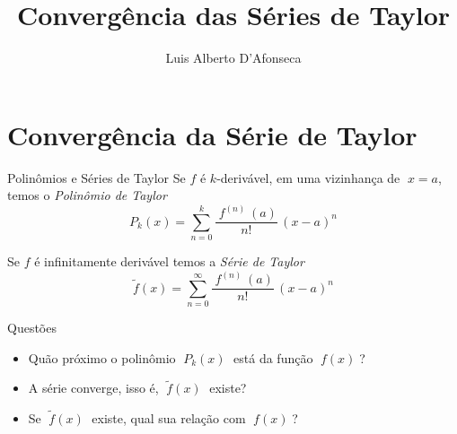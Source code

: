 
\usepackage{apresentacao}
\usepackage{tabto}

\graphicspath{{./figs/}}

\newcommand{\mytitle}   {Convergência das Séries de Taylor}
\title   {\mytitle}
\author  {\large Luis Alberto D'Afonseca}
\date    {}



\begin{frame}
    \titlepage
\end{frame}

\section{Convergência da Série de Taylor}

\begin{frame}{Polinômios e Séries de Taylor}
  Se $f$ é $k$-derivável, em uma vizinhança de $\;x=a$, temos o \emph{Polinômio de Taylor}
  \[
    P_k(x) = \sum_{n=0}^k \frac{\;f^{(n)\;}(a)}{n!}\,(x-a)^n
  \]

  \pause
  \vspace{\baselineskip}
  Se $f$ é infinitamente derivável temos a \emph{Série de Taylor}
  \[
    \tilde{f}(x) = \sum_{n=0}^\infty \frac{\;f^{(n)\;}(a)}{n!}\,(x-a)^n
  \]
\end{frame}

\begin{frame}{Questões}
  \begin{itemize}[<+->]
    \item Quão próximo o polinômio $\;P_k(x)\;$ está da função $\;f(x)\;$?
    \vspace{\baselineskip}
    \item A série converge, isso é, $\;\tilde{f}(x)\;$ existe?
    \vspace{\baselineskip}
    \item Se $\;\tilde{f}(x)\;$ existe, qual sua relação com $\;f(x)\;$?
  \end{itemize}
\end{frame}

